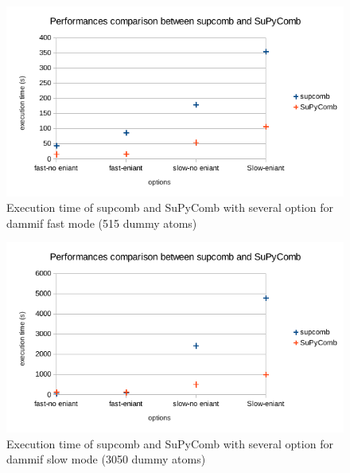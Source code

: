 \documentclass[a4paper, 11pt]{report}
\begin{document}
\begin{figure}
\includegraphics[scale=0.8]{perfdamfast.png}
\caption{Execution time of supcomb and SuPyComb with several option 
  for dammif fast mode (515 dummy atoms)}
\label{fgr:perfdamfast}
\end{figure} \vfill
\begin{figure}
\includegraphics[scale=0.8]{perfdamslow.png}
\caption{Execution time of supcomb and SuPyComb with several option 
  for dammif slow mode (3050 dummy atoms)}
\label{fgr:perfdamslow}
\end{figure}
\end{document}
